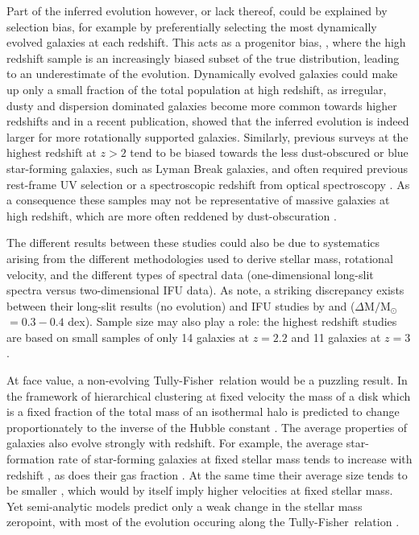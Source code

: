 \documentclass{emulateapj}
\newcommand{\msun}{$\mathrm{M_{\odot}}$}
\newcommand{\tf}{Tully-Fisher}
\begin{document}
Part of the inferred evolution however, or lack thereof, could be explained by selection bias, for example by preferentially selecting the most dynamically evolved galaxies at each redshift. This acts as a progenitor bias, \citep{vanDokkum01}, where the high redshift sample is an increasingly biased subset of the true distribution, leading to an underestimate of the evolution. Dynamically evolved galaxies could make up only a small fraction of the total population at high redshift, as irregular, dusty and dispersion dominated galaxies become more common towards higher redshifts \citep[e.g.][]{Abraham01,Kassin12,Spitler14} {and in a recent publication, \citet{Tiley16} showed that the inferred evolution is indeed larger for more rotationally supported galaxies}. Similarly, previous surveys at the highest redshift at $z>2$ tend to be biased towards the less dust-obscured or blue star-forming galaxies, such as Lyman Break galaxies, and often required previous rest-frame UV selection or a spectroscopic redshift from optical spectroscopy \citep[e.g.][]{ForsterSchreiber09,Gnerucci11}. As a consequence these samples may not be representative of massive galaxies at high redshift, which are more often reddened by dust-obscuration \citep[e.g.][]{Reddy05,Spitler14}. 

The different results between these studies could also be due to systematics arising from the different methodologies used to derive stellar mass, rotational velocity, and the different types of spectral data (one-dimensional long-slit spectra versus two-dimensional IFU data). As \citet{Miller12} note, a striking discrepancy exists between their long-slit results (no evolution) and IFU studies by \citet{Puech08,Vergani12} and \citet{Cresci09} ($\Delta \mathrm{M}/$\msun$=0.3-0.4$ dex). Sample size may also play a role: the highest redshift studies are based on small samples of only 14 galaxies at $z=2.2$ \citep{Cresci09} and 11 galaxies at $z=3$ \citep{Gnerucci11}. 

{At face value, a} non-evolving \tf\ relation would be a puzzling result{. In the framework of hierarchical clustering at fixed velocity the mass of a disk which is a fixed fraction of the total mass of an isothermal halo is predicted to change proportionately to the inverse of the Hubble constant \citep{Mo98,Glazebrook13}. }{T}he average properties of galaxies {also} evolve strongly with redshift. For example, the average star-formation rate of star-forming galaxies at fixed stellar mass tends to increase with redshift \citep[e.g.][]{Tomczak15}, as does their gas fraction \citep[e.g.][]{Papovich14}. At the same time their average size tends to be smaller \citep[e.g.][]{vanderWel14a}, which would by itself imply higher velocities at fixed stellar mass. {Yet semi-analytic models predict only a weak change in the stellar mass zeropoint, with most of the evolution occuring along the \tf\ relation \citep[e.g.,][]{Somerville08, Dutton11,Benson12}.}
\end{document}
